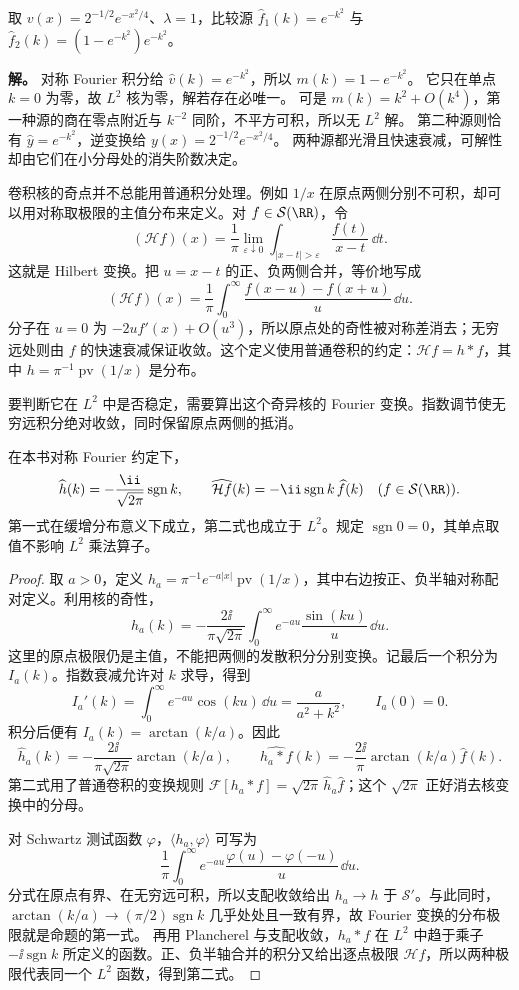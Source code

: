 \begin{workedexample}[高斯卷积的非零小分母仍可妨碍求解]
取 $v(x)=2^{-1/2}e^{-x^2/4}$、$\lambda=1$，比较源 $\widehat f_1(k)=e^{-k^2}$ 与 $\widehat f_2(k)=(1-e^{-k^2})e^{-k^2}$。

\textbf{解。} 对称 Fourier 积分给 $\widehat v(k)=e^{-k^2}$，所以 $m(k)=1-e^{-k^2}$。
它只在单点 $k=0$ 为零，故 $L^2$ 核为零，解若存在必唯一。
可是 $m(k)=k^2+O(k^4)$，第一种源的商在零点附近与 $k^{-2}$ 同阶，不平方可积，所以无 $L^2$ 解。
第二种源则恰有 $\widehat y=e^{-k^2}$，逆变换给 $y(x)=2^{-1/2}e^{-x^2/4}$。
两种源都光滑且快速衰减，可解性却由它们在小分母处的消失阶数决定。
\end{workedexample}
卷积核的奇点并不总能用普通积分处理。例如 $1/x$ 在原点两侧分别不可积，却可以用对称取极限的主值分布来定义。对 $f\in\mathcal S(\RR)$，令
\[
(\mathcal Hf)(x)=\frac1\pi\lim_{\varepsilon\downarrow0}
\int_{|x-t|>\varepsilon}\frac{f(t)}{x-t}\,\dd t.
\]
这就是 Hilbert 变换。把 $u=x-t$ 的正、负两侧合并，等价地写成
\[
(\mathcal Hf)(x)=\frac1\pi\int_0^\infty
\frac{f(x-u)-f(x+u)}u\,\dd u.
\]
分子在 $u=0$ 为 $-2uf'(x)+O(u^3)$，所以原点处的奇性被对称差消去；无穷远处则由 $f$ 的快速衰减保证收敛。这个定义使用普通卷积的约定：$\mathcal Hf=h*f$，其中 $h=\pi^{-1}\operatorname{pv}(1/x)$ 是分布。

要判断它在 $L^2$ 中是否稳定，需要算出这个奇异核的 Fourier 变换。指数调节使无穷远积分绝对收敛，同时保留原点两侧的抵消。
\begin{proposition}
在本书对称 Fourier 约定下，
\[
\widehat h(k)=-\frac{\ii}{\sqrt{2\pi}}\operatorname{sgn}k,
\qquad
\widehat{\mathcal Hf}(k)=-\ii\operatorname{sgn}k\,\widehat f(k)
\quad(f\in\mathcal S(\RR)).
\]
第一式在缓增分布意义下成立，第二式也成立于 $L^2$。规定 $\operatorname{sgn}0=0$，其单点取值不影响 $L^2$ 乘法算子。
\end{proposition}
\begin{proof}
取 $a>0$，定义 $h_a=\pi^{-1}e^{-a|x|}\operatorname{pv}(1/x)$，其中右边按正、负半轴对称配对定义。利用核的奇性，
\[
\widehat h_a(k)
=-\frac{2\ii}{\pi\sqrt{2\pi}}
\int_0^\infty e^{-au}\frac{\sin(ku)}u\,\dd u.
\]
这里的原点极限仍是主值，不能把两侧的发散积分分别变换。记最后一个积分为 $I_a(k)$。指数衰减允许对 $k$ 求导，得到
\[
I_a'(k)=\int_0^\infty e^{-au}\cos(ku)\,\dd u
=\frac a{a^2+k^2},\qquad I_a(0)=0.
\]
积分后便有 $I_a(k)=\arctan(k/a)$。因此
\[
\widehat h_a(k)=-\frac{2\ii}{\pi\sqrt{2\pi}}\arctan(k/a),
\qquad
\widehat{h_a*f}(k)=-\frac{2\ii}{\pi}\arctan(k/a)\widehat f(k).
\]
第二式用了普通卷积的变换规则 $\mathcal F[h_a*f]=\sqrt{2\pi}\,\widehat h_a\widehat f$；这个 $\sqrt{2\pi}$ 正好消去核变换中的分母。

对 Schwartz 测试函数 $\varphi$，$\langle h_a,\varphi\rangle$ 可写为
\[
\frac1\pi\int_0^\infty e^{-au}
\frac{\varphi(u)-\varphi(-u)}u\,\dd u.
\]
分式在原点有界、在无穷远可积，所以支配收敛给出 $h_a\to h$ 于 $\mathcal S'$。与此同时，$\arctan(k/a)\to(\pi/2)\operatorname{sgn}k$ 几乎处处且一致有界，故 Fourier 变换的分布极限就是命题的第一式。
再用 Plancherel 与支配收敛，$h_a*f$ 在 $L^2$ 中趋于乘子 $-\ii\operatorname{sgn}k$ 所定义的函数。正、负半轴合并的积分又给出逐点极限 $\mathcal Hf$，所以两种极限代表同一个 $L^2$ 函数，得到第二式。
\end{proof}

